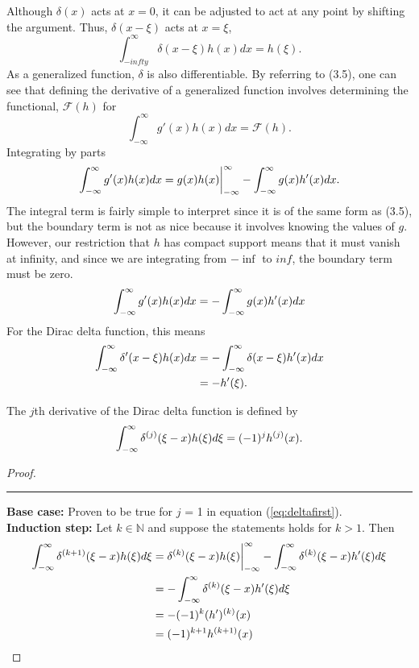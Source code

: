 Although \(\delta(x)\) acts at \(x=0\), it can be adjusted to act at any point by shifting the argument. Thus, \(\delta(x-\xi)\) acts at \(x=\xi\),
\begin{equation}
    \int_{-infty}^{\infty} \delta(x-\xi)h(x)dx = h(\xi).
\end{equation}
As a generalized function, \(\delta\) is also differentiable. By referring to (3.5), one can see that defining the derivative of a generalized function involves determining the functional, \(\mathcal{F}(h)\) for
\begin{equation}
    \int_{-\infty}^{\infty} g'(x)h(x) dx= \mathcal{F}(h).
\end{equation}
Integrating by parts
\begin{equation}
    \int_{-\infty}^{\infty} g'(x)h(x)dx = g(x)h(x)\biggr\rvert_{-\infty}^{\infty} - \int_{-\infty}^{\infty} g(x)h'(x)dx.
\end{equation}
The integral term is fairly simple to interpret since it is of the same form as (3.5), but the boundary term is not as nice because it involves knowing the values of \(g\). However, our restriction that \(h\) has compact support means that it must vanish at infinity, and since we are integrating from \(-\inf\) to \(inf\), the boundary term must be zero.
\begin{equation}
    \int_{-\infty}^{\infty} g'(x)h(x)dx = -\int_{-\infty}^{\infty} g(x)h'(x)dx
\end{equation}
For the Dirac delta function, this means
\begin{equation}
    \begin{split} \label{eq:deltafirst}
        \int_{-\infty}^{\infty} \delta'(x-\xi)h(x)dx &= -\int_{-\infty}^{\infty}\delta(x-\xi)h'(x)dx\\
        &=-h'(\xi).
    \end{split}
\end{equation}


\begin{theorem} \label{th:deltad}
    The \(j\)th derivative of the Dirac delta function is defined by
    \begin{equation}
         \int_{-\infty}^{\infty} \delta^{(j)}(\xi-x)h(\xi)d\xi = (-1)^jh^{(j)}(x).
    \end{equation}
\end{theorem}
\begin{proof}
    \noindent\rule{\textwidth}{1pt}
    \textbf{Base case:} Proven to be true for \(j\) = 1 in equation (\ref{eq:deltafirst}).\\
    \textbf{Induction step:} Let \(k \in \mathbb{N}\) and suppose the statements holds for \(k>1\). Then
    \begin{align*}
        \int_{-\infty}^{\infty} \delta^{(k+1)}(\xi-x)h(\xi)d\xi &= \delta^{(k)}(\xi-x)h(\xi)\biggr\rvert_{-\infty}^{\infty}-\int_{-\infty}^{\infty} \delta^{(k)}(\xi-x)h'(\xi)d\xi\\
        &=-\int_{-\infty}^{\infty} \delta^{(k)}(\xi-x)h'(\xi)d\xi\\
        &=-(-1)^{k}(h')^{(k)}(x)\\
        &=(-1)^{k+1}h^{(k+1)}(x)
    \end{align*}
\end{proof}

